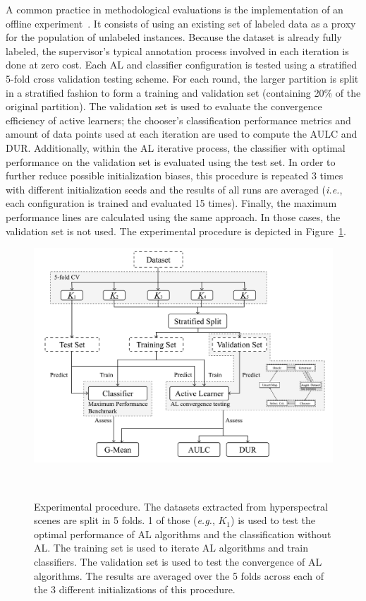 \documentclass[remotesensing,article,submit,moreauthors,pdftex]{Definitions/mdpi}
\begin{document}
\begin{paracol}{2}
A common practice in methodological evaluations is the implementation of an
offline experiment~\cite{Kagy2019}. It consists of using an existing set of
labeled data as a proxy for the population of unlabeled instances. Because the
dataset is already fully labeled, the supervisor's typical annotation process
involved in each iteration is done at zero cost. Each AL and classifier
configuration is tested using a stratified 5-fold cross validation testing
scheme. For each round, the larger partition is split in a stratified fashion
to form a training and validation set (containing 20\% of the original
partition). The validation set is used to evaluate the convergence efficiency
of active learners; the chooser's classification performance metrics and
amount of data points used at each iteration are used to compute the AULC and
DUR\@. Additionally, within the AL iterative process, the classifier with
optimal performance on the validation set is evaluated using the test set. In
order to further reduce possible initialization biases, this procedure is
repeated 3 times with different initialization seeds and the results of all
runs are averaged (\textit{i.e.}, each configuration is trained and evaluated
15 times). Finally, the maximum performance lines are calculated using the
same approach. In those cases, the validation set is not used. The
experimental procedure is depicted in Figure~\ref{fig:experiment_pipeline}.

\end{paracol}
\begin{figure}[H]
	\centering
	\includegraphics[width=.75\linewidth]{../analysis/experiment_pipeline}
    \caption{
        Experimental procedure. The datasets extracted from hyperspectral
        scenes are split in 5 folds. 1 of those (\textit{e.g.}, $K_1$) is used
        to test the optimal performance of AL algorithms and the
        classification without AL. The training set is used to iterate AL
        algorithms and train classifiers. The validation set is used to test
        the convergence of AL algorithms. The results are averaged over the 5
        folds across each of the 3 different initializations of this
        procedure.
    }~\label{fig:experiment_pipeline}
\end{figure}
\end{document}
